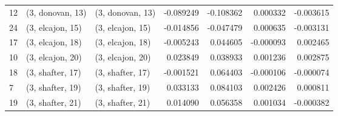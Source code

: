 \begin{tabular}{lllrrrr}
12 &  (3, donovan, 13) &  (3, donovan, 13) & -0.089249 & -0.108362 &   0.000332 & -0.003615 \\
24 &  (3, elcajon, 15) &  (3, elcajon, 15) & -0.014856 & -0.047479 &   0.000635 & -0.003131 \\
17 &  (3, elcajon, 18) &  (3, elcajon, 18) & -0.005243 &  0.044605 &  -0.000093 &  0.002465 \\
10 &  (3, elcajon, 20) &  (3, elcajon, 20) &  0.023849 &  0.038933 &   0.001236 &  0.002875 \\
18 &  (3, shafter, 17) &  (3, shafter, 17) & -0.001521 &  0.064403 &  -0.000106 & -0.000074 \\
7  &  (3, shafter, 19) &  (3, shafter, 19) &  0.033133 &  0.084103 &   0.002426 &  0.000811 \\
19 &  (3, shafter, 21) &  (3, shafter, 21) &  0.014090 &  0.056358 &   0.001034 & -0.000382 \\
\bottomrule
\end{tabular}
